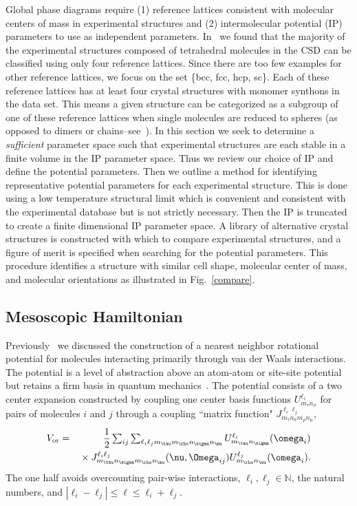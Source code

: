 \documentclass[preprint]{iucr}              %
\newcommand{\mb}[1]{\ensuremath{\mbox{\boldmath $ #1 $}}}
\begin{document}
Global phase diagrams require (1) reference lattices consistent with
molecular centers of mass in experimental structures and (2)
intermolecular potential (IP) parameters to use as independent
parameters. In~\cite{McClurg09} we found that the majority of the
experimental structures composed of tetrahedral molecules in the CSD can be
classified using only four reference lattices. Since there are too few examples
for other reference lattices, we focus on the set \{bcc, fcc,
hcp, sc\}. Each of these reference lattices has at least four crystal
structures with monomer synthons in the data set.  This means a given structure
can be categorized as a subgroup of one of these reference lattices when single
molecules are reduced to spheres (as opposed to dimers or chains--see~\cite{McClurg09}).  In this section we seek to determine a \emph{sufficient}
parameter space such that experimental
structures are each stable in a finite volume in the IP parameter space. Thus we
review
our choice of IP and define the potential parameters.  Then we
outline a method for identifying representative potential parameters
for each experimental structure. This is done using a low
temperature structural limit which is convenient and consistent with the
experimental database but is not strictly necessary.  Then
the IP is truncated to create a finite dimensional IP parameter
space.  A library of alternative crystal structures is constructed
with which to compare experimental structures, and a figure of merit
is specified when searching for the potential parameters. This
procedure identifies a structure with similar cell shape, molecular
center of mass, and molecular orientations as illustrated in
Fig.~\ref{compare}.

\subsection{Mesoscopic Hamiltonian}
\label{hamiltonian}

Previously~\cite{Mettes04} we discussed the construction of a
nearest neighbor rotational potential for molecules interacting primarily
through van der Waals interactions.
The potential is a level of abstraction above an atom-atom or site-site
potential but retains a firm basis in quantum
mechanics~\cite{Avoird94}. The potential consists of a two center
expansion constructed by coupling one center basis functions
$U^{\ell_i}_{m_\tau n_\sigma}$ 
for pairs of molecules $i$ and $j$ through a coupling ``matrix function" 
$J_{m_\tau n_\sigma m_\rho n_\mu}^{\ell_i\ell_j}$,
\begin{eqnarray}
\label{re:eq:vij2}V_{\mathrm{or}} &=&
\frac{1}{2}\sum_{ij}\sum_{\ell_i\ell_j m_\tau m_\rho n_\sigma n_\mu}
U^{\ell_i}_{m_\tau n_\sigma}(\mb{\omega}_i)\nonumber\\
&&{}\times J_{m_\tau n_\sigma m_\rho n_\mu}^{\ell_i
\ell_j}(\mb{\nu},\mb{\Omega}_{ij})U^{\ell_j}_{m_\rho
n_\mu}(\mb{\omega}_i).
\end{eqnarray}
The one half avoids overcounting pair-wise interactions,
$\ell_i,\ell_j\in\mathbb{N}$, the
natural numbers, and $|\ell_i-\ell_j|\leq\ell\leq \ell_i+\ell_j$.
\end{document}
